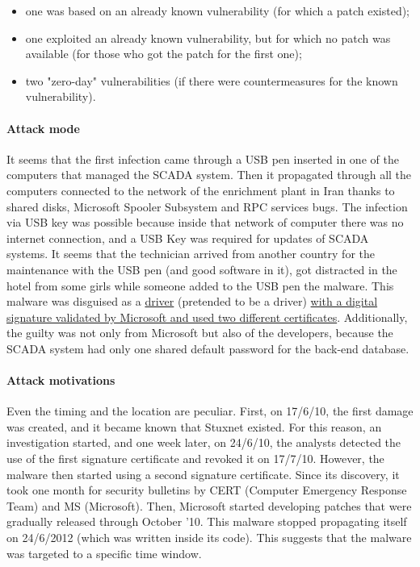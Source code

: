 \begin{itemize}
  \item one was based on an already known vulnerability (for which a patch existed);
  \item one exploited an already known vulnerability, but for which no patch was available (for those who got the patch for the first one);
  \item two "zero-day" vulnerabilities (if there were countermeasures for the known vulnerability).
\end{itemize}

\paragraph*{Attack mode}
It seems that the first infection came through a USB pen inserted in one of the computers that managed the
SCADA system. Then it propagated through all the computers connected to the network of the enrichment
plant in Iran thanks to shared disks, Microsoft Spooler Subsystem and RPC services bugs. The infection via
USB key was possible because inside that network of computer there was no internet connection, and a USB
Key was required for updates of SCADA systems. It seems that the technician arrived from another country
for the maintenance with the USB pen (and good software in it), got distracted in the hotel from some girls
while someone added to the USB pen the malware. This malware was disguised as a \ul{driver} (pretended to be a
driver) \ul{with a digital signature validated by Microsoft and used two different certificates}. Additionally, the
guilty was not only from Microsoft but also of the developers, because the SCADA system had only one shared
default password for the back-end database.

\paragraph*{Attack motivations}
Even the timing and the location are peculiar. First, on 17/6/10, the first damage was created, and it became known that Stuxnet existed. For this reason, an investigation started, and one week later, on 24/6/10, the analysts detected the use of the first signature certificate and revoked it on 17/7/10. However, the malware then started using a second signature certificate. Since its discovery, it took one month for security bulletins by CERT (Computer Emergency Response Team) and MS (Microsoft). Then, Microsoft started developing patches that were gradually released through October '10. This malware stopped propagating itself on 24/6/2012 (which was written inside its code). This suggests that the malware was targeted to a specific time window.

